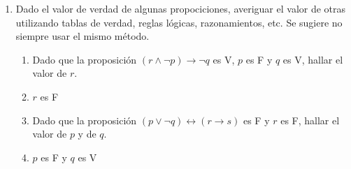 \documentclass[a4paper]{article}
\newcommand{\answer}{\item[**]}
\newcommand{\exercise}{\item}
\newcommand{\then}{\to}
\newcommand{\eq}{\leftrightarrow}
\begin{document}
\begin{enumerate}
\begin{enumerate} [label=(\alph*)]
		\item Si $\neg p\then p$, entonces $p$
		\item Si $p\then q$ y $\neg q$ , entonces $\neg p$
		\item Si $p\then q$ y $q\then r$ y $p$, entonces $r$
		\item Si $\neg p$, entonces $\neg (p\land q)$
		\item Si $p\then r$ y $q\then r$ y $r\then s\land t$ y $p\lor q$, entonces $s$
		\item Si $p\then q$ y $q\lor r\then s$, entonces $p\lor r\then  s$
		\item Si $p\then q$ y $q\land r\then s$, entonces $p\land r\then  s$
		\item Si $p\then  q$  y $q\eq r$  y $\neg r$, entonces $\neg p$
		\item Si $p\then q$ y $r\land p$ y $q\eq s$, entonces $q\land s$
		\item Si $(p\then q)$ y $(r\then s)$, entonces $(p\land r)\then (q\land s)$ 
		\item Si $(p \then  q)$ y $(p \lor  s)$ y $~q$, entonces $s$
		\item Si $(p \then  q)$ y $(s \lor  ~q)$ y $~s$, entonces $~p$
		\item Si $(p \land  q)$ y $((p \lor  r) \then  t)$, entonces $p\land t$
		\item Si $(p \lor  q)$ y $(r \lor  s)$ y $((p \then  r) \land  (q \then  s)) \land  ~r$, entonces $s$
		\item Si $(p \then  q)$ y $(q \then  r)$ y $(s \then  t)$ y $(p \lor  s)$, entonces $r\lor t$
		\item Si $(p \then  q)$ y $((p \land  q) \then  r)$ y $~(p \land  q)$, entonces $~p$
		\item Si $(q \then  r)$ y $(~s \then  (t \then  u))$ y $(s \lor  (q \lor  t))$ y $~s$, entonces $r\lor u$

	\end{enumerate}
	
	\exercise Dado el valor de verdad de algunas propociciones, averiguar el valor de otras utilizando tablas de verdad, reglas lógicas, razonamientos, etc. Se sugiere no siempre usar el mismo método.
	\begin{enumerate} [label=(\alph*)]

		\item Dado que la proposición $(r\land \neg p)\then \neg q$ es V, $p$ es F y $q$ es V, hallar el valor de $r$. 
		\answer $r$ es F 

		\item Dado que la proposición $(p\lor \neg q) \eq  (r\then s)$ es F  y $r$ es F, hallar el valor de $p$ y de $q$. 
		\answer $p$ es F y $q$ es V


\end{enumerate}
\end{enumerate}
\end{document}
